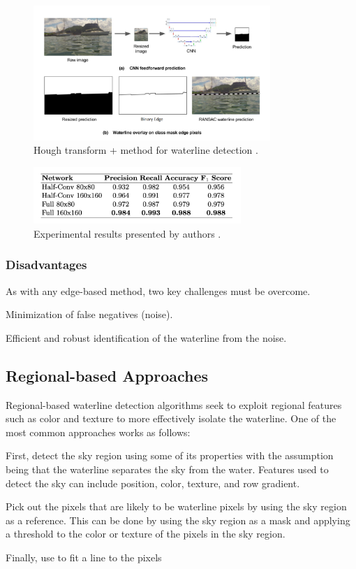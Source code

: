 \begin{figure}[htb]
  \includegraphics*[width=0.8\textwidth]{one.png}
  \caption{
    Hough transform + \ransac method for waterline detection
    \cite{steccanella-2019,zhan-2017}.
  }
\end{figure}

\begin{figure}[H]
  \includegraphics*[width=0.7\textwidth]{one-results.png}
  \caption{
    Experimental results presented by authors
    \cite{steccanella-2019}.
  }
\end{figure}

\step
\subsubsection{Disadvantages}
As with any edge-based method, two key challenges must be overcome\cite{zhan-2017}.
\begin{enumroman}
  \item Minimization of false negatives (noise).
  \item Efficient and robust identification of the waterline from the  noise.
\end{enumroman}

\subsection{Regional-based Approaches}
Regional-based waterline detection algorithms seek to exploit regional features
such as color and texture to more effectively isolate the waterline.
One of the most common approaches works as follows:
\begin{enumroman}
  \item First, detect the sky region using some of its properties
    with the assumption being that the waterline separates the sky
    from the water. Features used to detect the sky can include
    position, color, texture, and row gradient.
  \item Pick out the pixels that are likely to be waterline pixels
    by using the sky region as a reference.
    This can be done by using the sky region as a mask and
    applying a threshold to the color or texture of the pixels
    in the sky region.
  \item Finally, use \ransac to fit a line to the pixels
\end{enumroman}

